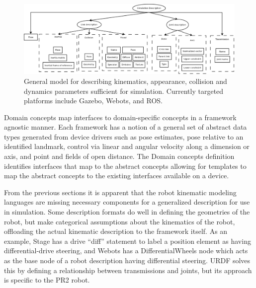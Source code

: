 \begin{figure}[thpb]
      \centering
      \includegraphics[width=6in]{kvc.pdf}
      \caption{General model for describing kinematics, appearance, collision and dynamics parameters sufficient for simulation.  Currently targeted platforms include Gazebo, Webots, and ROS.}
      \label{kvc}
\end{figure}

Domain concepts map interfaces to domain-specific concepts in a framework agnostic manner.  Each framework has a notion of a general set of abstract data types generated from device drivers such as pose estimates, pose relative to an identified landmark, control via linear and angular velocity along a dimension or axis, and point and fields of open distance.  The {\sc Domain concepts} definition identifies interfaces that map to the abstract concepts allowing for templates to map the abstract concepts to the existing interfaces available on a device.

From the previous sections it is apparent that the robot kinematic modeling languages are missing necessary components for a generalized description for use in simulation. Some description formats do well in defining the geometries of the robot, but make categorical assumptions about the kinematics of the robot, offloading the actual kinematic description to the framework itself. As an example, Stage has a drive ``diff'' statement to label a position element as having differential-drive steering, and Webots has a DifferentialWheels node which acts as the base node of a robot description having differential steering. URDF solves this by defining a relationship between transmissions and joints, but its approach is specific to the PR2 robot.

